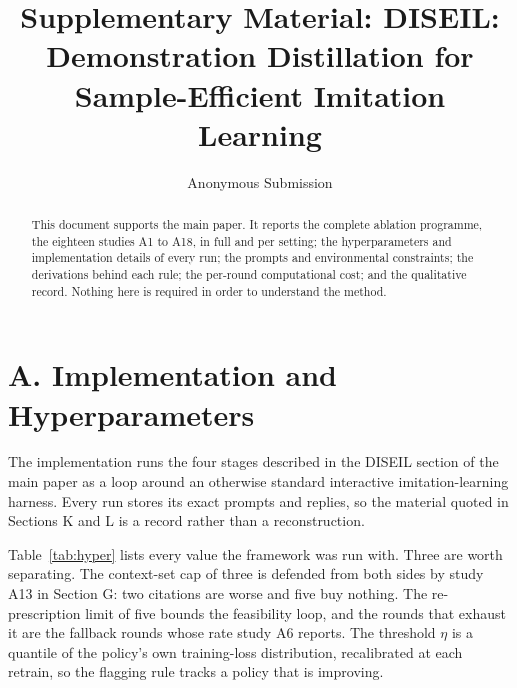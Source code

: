\documentclass[letterpaper]{article}
\title{Supplementary Material: DISEIL: Demonstration Distillation for\\Sample-Efficient Imitation Learning}
\author{Anonymous Submission}
\begin{document}
\maketitle

\begin{abstract}
This document supports the main paper. It reports the complete ablation programme,
the eighteen studies A1 to A18, in full and per setting; the hyperparameters and
implementation details of every run; the prompts and environmental constraints; the
derivations behind each rule; the per-round computational cost; and the qualitative
record. Nothing here is required in order to understand the method.
\end{abstract}

\section{A. Implementation and Hyperparameters}

The implementation runs the four stages described in the DISEIL section of the main
paper as a loop around an otherwise standard interactive imitation-learning harness.
Every run stores its exact prompts and replies, so the material quoted in
Sections K and L is a record rather than a reconstruction.

Table~\ref{tab:hyper} lists every value the framework was run with. Three are worth
separating. The context-set cap of three is defended from both sides by study A13 in
Section G: two citations are worse and five buy nothing. The re-prescription limit of
five bounds the feasibility loop, and the rounds that exhaust it are the fallback
rounds whose rate study A6 reports. The threshold $\eta$ is a quantile of the policy's
own training-loss distribution, recalibrated at each retrain, so the flagging rule
tracks a policy that is improving.
\end{document}
